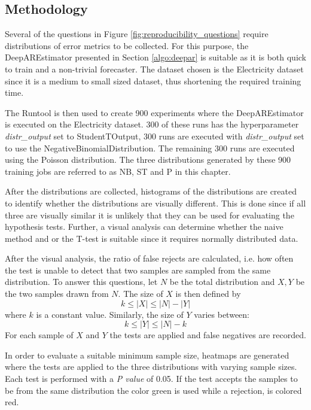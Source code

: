 \subsection{Methodology}
\label{hypothesis_test_methodology}
Several of the questions in Figure \ref{fig:reproducibility_questions} require distributions of error metrics to be collected. For this purpose, the DeepAREstimator presented in Section \ref{algo:deepar} is suitable as it is both quick to train and a non-trivial forecaster. The dataset chosen is the Electricity dataset since it is a medium to small sized dataset, thus shortening the required training time.

The Runtool is then used to create 900 experiments where the DeepAREstimator is executed on the Electricity dataset. 300 of these runs has the hyperparameter \textit{distr\_output} set to StudentTOutput, 300 runs are executed with \textit{distr\_output} set to use the NegativeBinomialDistribution. The remaining 300 runs are executed using the Poisson distribution. The three distributions generated by these 900 training jobs are referred to as NB, ST and P in this chapter.

After the distributions are collected, histograms of the distributions are created to identify whether the distributions are visually different. This is done since if all three are visually similar it is unlikely that they can be used for evaluating the hypothesis tests. Further, a visual analysis can determine whether the naive method and or the T-test is suitable since it requires normally distributed data.

After the visual analysis, the ratio of false rejects are calculated, i.e. how often the test is unable to detect that two samples are sampled from the same distribution. To answer this questions, let \(N\) be the total distribution and \(X,Y\) be the two samples drawn from \(N\). The size of \(X\) is then defined by \[k \leq |X| \leq |N| - |Y|\] where \(k\) is a constant value. Similarly, the size of \(Y\) varies between: \[k	\leq |Y| \leq |N|-k\] For each sample of \(X\) and \(Y\) the tests are applied and false negatives are recorded.

In order to evaluate a suitable minimum sample size, heatmaps are generated where the tests are applied to the three distributions with varying sample sizes. Each test is performed with a \textit{P value} of 0.05. If the test accepts the samples to be from the same distribution the color green is used while a rejection, is colored red.

